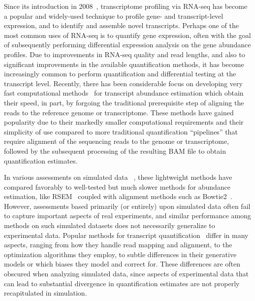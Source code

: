 Since its introduction in 2008~\citep{lister,nagalakshmi,mortazavi2008mapping}, transcriptome
profiling via RNA-seq has become a popular and widely-used technique to profile gene-
and transcript-level expression, and to identify and assemble novel transcripts.
Perhaps one of the most common uses of RNA-seq is to quantify gene expression,
often with the goal of subsequently performing differential expression analysis
on the gene abundance profiles. Due to improvements in RNA-seq quality and read
lengths, and also to significant improvements in the available quantification
methods, it has become increasingly common to perform quantification and
differential testing at the transcript level. Recently, there has been
considerable focus on developing very fast computational
methods~\citep{sailfish,kallisto,salmon,fleximer} for transcript abundance
estimation which obtain their speed, in part, by forgoing the traditional
prerequisite step of aligning the reads to the reference genome or
transcriptome. These methods have gained popularity due to their
markedly smaller computational requirements and their simplicity of use compared to more
traditional quantification ``pipelines'' that require alignment of the
sequencing reads to the genome or transcriptome, followed by the subsequent
processing of the resulting BAM file to obtain quantification estimates.

In various assessments on simulated data 
~\citep{kanitz2015comparative,germain2016rnaonthebench,zhang2017evaluation}, these lightweight 
methods have compared favorably to well-tested but much slower methods for
abundance estimation, like RSEM~\citep{li2011rsem} coupled with alignment methods such
as Bowtie2~\citep{bowtie2}. However, assessments based primarily (or entirely)
upon simulated data often fail to capture important aspects of real experiments,
and similar performance among methods on such simulated datasets does not
necessarily generalize to experimental data. Popular methods for transcript
quantification~\citep{rnaskim,fleximer,salmon,kallisto,sailfish,li2011rsem, heraem} 
differ in many aspects, ranging from how they handle read mapping
and alignment, to the optimization algorithms they employ, to subtle differences
in their generative models or which biases they model and correct for. These
differences are often obscured when analyzing simulated data, since aspects of
experimental data that can lead to substantial divergence in quantification
estimates are not properly recapitulated in simulation.

